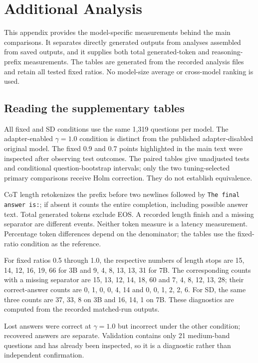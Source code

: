 \documentclass[a4paper,runningheads]{llncs}
\begin{document}
\appendix
\section{Additional Analysis}

This appendix provides the model-specific measurements behind the main comparisons. It separates directly generated outputs from analyses assembled from saved outputs, and it supplies both total generated-token and reasoning-prefix measurements. The tables are generated from the recorded analysis files and retain all tested fixed ratios. No model-size average or cross-model ranking is used.

\subsection{Reading the supplementary tables}
All fixed and SD conditions use the same 1,319 questions per model. The adapter-enabled $\gamma=1.0$ condition is distinct from the published adapter-disabled original model. The fixed 0.9 and 0.7 points highlighted in the main text were inspected after observing test outcomes. The paired tables give unadjusted tests and conditional question-bootstrap intervals; only the two tuning-selected primary comparisons receive Holm correction. They do not establish equivalence.

CoT length retokenizes the prefix before two newlines followed by \texttt{The final answer is:}; if absent it counts the entire completion, including possible answer text. Total generated tokens exclude EOS. A recorded length finish and a missing separator are different events. Neither token measure is a latency measurement. Percentage token differences depend on the denominator; the tables use the fixed-ratio condition as the reference.

For fixed ratios 0.5 through 1.0, the respective numbers of length stops are 15, 14, 12, 16, 19, 66 for 3B and 9, 4, 8, 13, 13, 31 for 7B. The corresponding counts with a missing separator are 15, 13, 12, 14, 18, 60 and 7, 4, 8, 12, 13, 28; their correct-answer counts are 0, 1, 0, 0, 4, 14 and 0, 0, 1, 2, 2, 6. For SD, the same three counts are 37, 33, 8 on 3B and 16, 14, 1 on 7B. These diagnostics are computed from the recorded matched-run outputs.

Lost answers were correct at $\gamma=1.0$ but incorrect under the other condition; recovered answers are separate. Validation contains only 21 medium-band questions and has already been inspected, so it is a diagnostic rather than independent confirmation.
\end{document}
